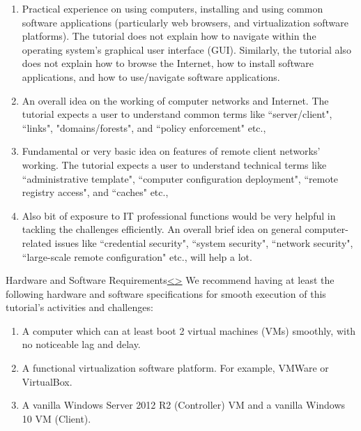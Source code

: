 \documentclass[12pt]{extarticle}
\newenvironment{instructionblock}{\Large\bgroup}{\egroup}
\newcommand{\ben}{\begin{enumerate}}
\newcommand{\een}{\end{enumerate}}
\begin{document}
	\ben
	
	
	\item Practical experience on using computers, installing and using common software applications (particularly web browsers, and virtualization software platforms). The tutorial does not explain how to navigate within the operating system's graphical user interface (GUI). Similarly, the tutorial also does not explain how to browse the Internet, how to install software applications, and how to use/navigate software applications. 
	
	\item An overall idea on the working of computer networks and Internet. The tutorial expects a user to understand common terms like ``server/client", ``links", "domains/forests", and ``policy enforcement" etc., 
	
	\item Fundamental or very basic idea on features of remote client networks' working. The tutorial expects a user to understand technical terms like ``administrative template", ``computer configuration deployment", ``remote registry access", and ``caches" etc.,
	
	\item Also bit of exposure to IT professional functions would be very helpful in tackling the challenges efficiently. An overall brief idea on general computer-related issues like ``credential security", ``system security", ``network security", ``large-scale remote configuration" etc., will help a lot.
	
	
	\een 
	
	
	
	
	
	
	
	\pagebreak
	\begin{slide}{Hardware and Software Requirements}{\hyperref[slide 2]{\textless}\hyperref[slide 4]{\textgreater}}
		\begin{instructionblock}
			We recommend having at least the following hardware and software specifications for smooth execution of this tutorial's activities and challenges:
			\begin{enumerate}
				\item {A computer which can at least boot 2 virtual machines (VMs) smoothly, with no noticeable lag and delay.}
				\item {A functional virtualization software platform. For example, VMWare or VirtualBox.}
				\item {A vanilla Windows Server 2012 R2 (Controller) VM and a vanilla Windows 10 VM (Client).  }
			\end{enumerate}
		\end{instructionblock}
	\end{slide}
	
\end{document}
